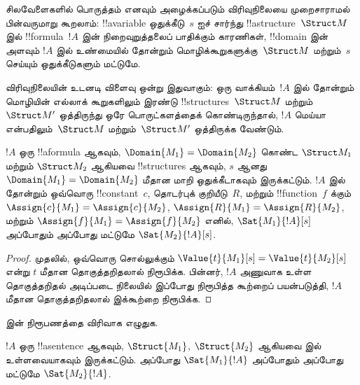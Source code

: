 \documentclass[../../../include/open-logic-section]{subfiles}
\begin{document}



\begin{explain}
சிலவேளைகளில் பொருத்தம் எனவும் அழைக்கப்படும் விரிவுநிலையை
முறைசாராமல் பின்வருமாறு கூறலாம்: !!a{variable} ஒதுக்கீடு~$s$ ஐச்
சார்ந்து !!a{structure}~$\Struct M$ இல் !!{formula}~$!A$ இன்
நிறைவுறுத்தலைப் பாதிக்கும் காரணிகள், !!{domain} இன் அளவும் $!A$ இல்
உண்மையில் தோன்றும் மொழிக்கூறுகளுக்கு~$\Struct M$ மற்றும்~$s$ செய்யும்
ஒதுக்கீடுகளும் மட்டுமே.

விரிவுநிலையின் உடனடி விளைவு ஒன்று இதுவாகும்: ஒரு வாக்கியம்~$!A$ இல்
தோன்றும் மொழியின் எல்லாக் கூறுகளிலும் இரண்டு !!{structure}s~$\Struct M$
மற்றும்~$\Struct M'$ ஒத்திருந்து ஒரே பொருட்களத்தைக் கொண்டிருந்தால்,
$!A$ மெய்யா என்பதிலும்~$\Struct M$ மற்றும்~$\Struct M'$ ஒத்திருக்க
வேண்டும்.
\end{explain}

\begin{prop}[விரிவுநிலை]
  $!A$ ஒரு !!a{formula} ஆகவும், $\Domain{M_1} = \Domain{M_2}$ கொண்ட
  $\Struct M_1$ மற்றும் $\Struct M_2$ ஆகியவை !!{structure}s ஆகவும்,
  $s$ ஆனது $\Domain{M_1} = \Domain{M_2}$ மீதான மாறி ஒதுக்கீடாகவும்
  இருக்கட்டும். $!A$ இல் தோன்றும் ஒவ்வொரு !!{constant}~$c$, தொடர்புக்
  குறியீடு~$R$, மற்றும் !!{function}~$f$ க்கும்
  $\Assign{c}{M_1} = \Assign{c}{M_2}$, $\Assign{R}{M_1}=\Assign{R}{M_2}$,
  மற்றும் $\Assign{f}{M_1} = \Assign{f}{M_2}$ எனில்,
  $\Sat{M_1}{!A}[s]$ அப்போதும் அப்போது மட்டுமே $\Sat{M_2}{!A}[s]$.
\end{prop}

\begin{proof}
  முதலில், ஒவ்வொரு சொல்லுக்கும்
  $\Value{t}{M_1}[s] = \Value{t}{M_2}[s]$ என்று $t$ மீதான
  தொகுத்தறிதலால் நிரூபிக்க. பின்னர், $!A$ அணுவாக உள்ள தொகுத்தறிதல்
  அடிப்படை நிலையில் இப்போது நிரூபித்த கூற்றைப் பயன்படுத்தி, $!A$
  மீதான தொகுத்தறிதலால் இக்கூற்றை நிரூபிக்க.
\end{proof}

\begin{prob}
 இன் நிரூபணத்தை விரிவாக
எழுதுக.
\end{prob}

\begin{cor}[!!^{sentence}s க்கான விரிவுநிலை]
  $!A$ ஒரு !!a{sentence} ஆகவும், $\Struct{M_1}$, $\Struct{M_2}$ ஆகியவை
   இல் உள்ளவையாகவும் இருக்கட்டும். அப்போது
  $\Sat{M_1}{!A}$ அப்போதும் அப்போது மட்டுமே $\Sat{M_2}{!A}$.
\end{cor}
\end{document}
